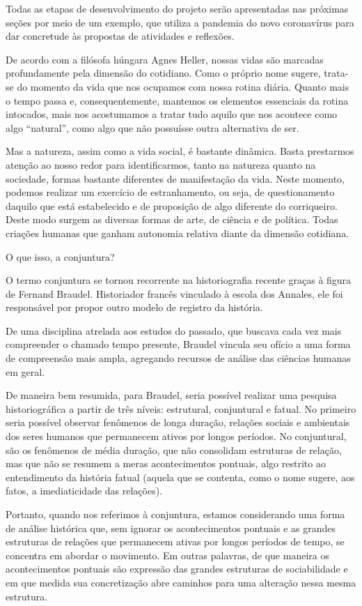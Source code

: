 Todas as etapas de desenvolvimento do projeto serão apresentadas nas próximas seções por meio de um exemplo, que utiliza a pandemia do novo coronavírus para dar concretude às propostas de atividades e reflexões.


De acordo com a filósofa húngara Agnes Heller, nossas vidas são marcadas profundamente pela dimensão do cotidiano. Como o próprio nome sugere, trata-se do momento da vida que nos ocupamos com nossa rotina diária. Quanto mais o tempo passa e, consequentemente, mantemos os elementos essenciais da rotina intocados, mais nos acostumamos a tratar tudo aquilo que nos acontece como algo “natural”, como algo que não possuísse outra alternativa de ser.

Mas a natureza, assim como a vida social, é bastante dinâmica. Basta prestarmos atenção ao nosso redor para identificarmos, tanto na natureza quanto na sociedade, formas bastante diferentes de manifestação da vida. Neste momento, podemos realizar um exercício de estranhamento, ou seja, de questionamento daquilo que está estabelecido e de proposição de algo diferente do corriqueiro. Deste modo surgem as diversas formas de arte, de ciência e de política. Todas criações humanas que ganham autonomia relativa diante da dimensão cotidiana.

\begin{knowledge}{O que isso, a conjuntura?}

O termo conjuntura se tornou recorrente na historiografia recente graças à figura de Fernand Braudel. Historiador francês vinculado à escola dos Annales, ele foi responsável por propor outro modelo de registro da  história.

De uma disciplina atrelada aos estudos do passado, que buscava cada vez mais compreender o chamado tempo presente, Braudel vincula seu ofício a uma forma de compreensão mais ampla, agregando recursos de análise das ciências humanas em geral.

De maneira bem resumida, para Braudel, seria possível realizar uma pesquisa historiográfica a partir de três níveis: estrutural, conjuntural e fatual. No primeiro seria possível observar fenômenos de longa duração, relações sociais e ambientais dos seres humanos que permanecem ativos por longos períodos. No conjuntural, são os fenômenos de média duração, que não consolidam estruturas de relação, mas que não se resumem a meras acontecimentos pontuais, algo restrito ao entendimento da história fatual (aquela que se contenta, como o nome sugere, aos fatos, a imediaticidade das relações).

Portanto, quando nos referimos à conjuntura, estamos considerando uma forma de análise histórica que, sem ignorar os acontecimentos pontuais e as grandes estruturas de relações que permanecem ativas por longos períodos de tempo, se concentra em abordar o movimento. Em outras palavras, de que maneira os acontecimentos pontuais são expressão das grandes estruturas de sociabilidade e em que medida sua concretização abre caminhos para uma alteração nessa mesma estrutura.

\end{knowledge}


